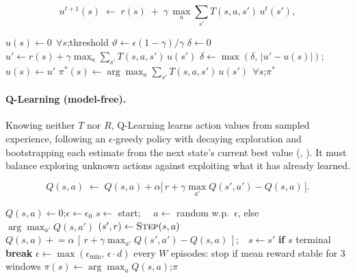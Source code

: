 \documentclass{ai-lab-report}
\begin{document}
\begin{equation}
u^{t+1}(s)\;\leftarrow\; r(s)\;+\;\gamma\,\max_{a}\sum_{s'} T(s,a,s')\,u^{t}(s'),
\label{eq:bellman}
\end{equation}

\begin{algorithm}[H]
\caption{Value Iteration.}
\label{alg:vi}
\begin{algorithmic}[1]
\State $u(s)\gets0\ \ \forall s$;\quad threshold $\vartheta\gets\epsilon(1-\gamma)/\gamma$
\Repeat
  \State $\delta\gets0$
    \State $u'\gets r(s)+\gamma\max_a\sum_{s'}T(s,a,s')\,u(s')$
    \State $\delta\gets\max(\delta,\,|u'-u(s)|)$;\quad $u(s)\gets u'$
  \EndFor
\Until{$\delta<\vartheta$}
\State $\pi^\ast(s)\gets\arg\max_a\sum_{s'}T(s,a,s')\,u(s')\ \ \forall s$;\quad \Return $\pi^\ast$
\end{algorithmic}
\end{algorithm}

\paragraph{Q-Learning (model-free).}
Knowing neither $T$ nor $R$, Q-Learning learns action values from sampled experience, following an $\epsilon$-greedy policy with decaying exploration and bootstrapping each estimate from the next state's current best value (, ). It must balance exploring unknown actions against exploiting what it has already learned.

\begin{equation}
Q(s,a)\;\leftarrow\; Q(s,a) + \alpha\big[\,r + \gamma\max_{a'}Q(s',a') - Q(s,a)\,\big].
\label{eq:qlearn}
\end{equation}

\begin{algorithm}[H]
\caption{Q-Learning ($\epsilon$-greedy, decaying $\epsilon$, with a convergence check).}
\label{alg:ql}
\begin{algorithmic}[1]
\State $Q(s,a)\gets0$;\quad $\epsilon\gets\epsilon_0$
  \State $s\gets$ start;\ \ 
    \State $a\gets$ random w.p.\ $\epsilon$, else $\arg\max_{a'}Q(s,a')$ 
    \State $(s',r)\gets\textsc{Step}(s,a)$ 
    \State $Q(s,a)\mathrel{+}=\alpha\,[\,r+\gamma\max_{a'}Q(s',a')-Q(s,a)\,]$;\ \ $s\gets s'$
    \State \textbf{if} $s$ terminal \textbf{break}
  \EndFor
  \State $\epsilon\gets\max(\epsilon_{\min},\,\epsilon\cdot d)$ 
  \State every $W$ episodes: stop if mean reward stable for $3$ windows
\EndFor
\State $\pi(s)\gets\arg\max_a Q(s,a)$;\quad \Return $\pi$
\end{algorithmic}
\end{algorithm}
\end{document}
